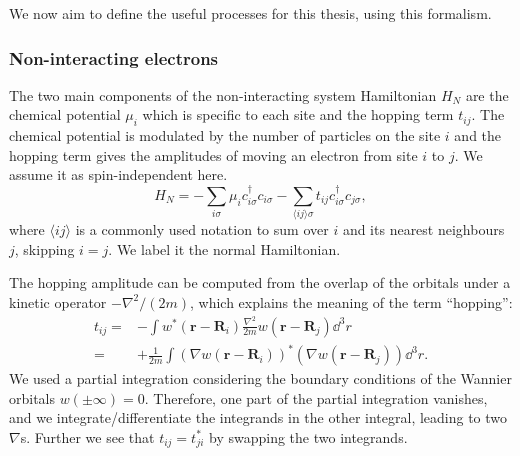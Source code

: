 \documentclass[../main.tex]{subfile}
\begin{document}
We now aim to define the useful processes for this thesis, using this formalism.

\subsubsection{Non-interacting electrons}
The two main components of the non-interacting system Hamiltonian $H_N$ are the chemical potential $\mu_i$ which is specific to each site and the hopping term $t_{ij}$.
The chemical potential is modulated by the number of particles on the site $i$ and the hopping term gives the amplitudes of moving an electron from site $i$ to $j$.
We assume it as spin-independent here.
\begin{equation}\label{eq:Ham_Normal}
    H_N = - \sum_{i \sigma} \mu_i c_{i\sigma}^{\dagger} c_{i\sigma} - \sum_{\langle ij\rangle \sigma} t_{ij} c_{i\sigma}^{\dagger} c_{j\sigma},
\end{equation}
where $\langle ij\rangle$ is a commonly used notation to sum over $i$ and its nearest neighbours $j$, skipping $i=j$. We label it the normal
Hamiltonian.

The hopping amplitude can be computed from the overlap of the orbitals under a kinetic operator $-\nabla^2/(2m)$, which explains the meaning of the term ``hopping'':
\begin{align*}
    t_{ij} =& -\int w^{\ast}(\bm{r} - \bm{R}_i) \frac{\nabla^2}{2m} w(\bm{r} - \bm{R}_j) \dd^3r\\
           =& +\frac{1}{2m}\int \left(\nabla w(\bm{r} - \bm{R}_i)\right)^{\ast} \left(\nabla w(\bm{r} - \bm{R}_j)\right) \dd^3r.
\end{align*}
We used a partial integration considering the boundary conditions of the Wannier orbitals $w(\pm \infty) = 0$. Therefore, one part of the partial integration vanishes,
and we integrate/differentiate the integrands in the other integral, leading to two $\nabla$s. Further we see that $t_{ij} = t_{ji}^{\ast}$ by swapping the two integrands.\\
\end{document}
